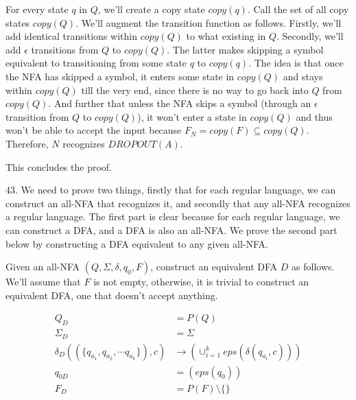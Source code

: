 \documentclass{article}
\begin{document}
For every state $q$ in $Q$, we'll create a copy state $copy(q)$. Call the set of all copy states $copy(Q)$. We'll augment the transition function as follows. Firstly, we'll add identical transitions within $copy(Q)$ to what existing in $Q$. Secondly, we'll add $\epsilon$ transitions from $Q$ to $copy(Q)$. The latter makes skipping a symbol equivalent to transitioning from some state $q$ to $copy(q)$. The idea is that once the NFA has skipped a symbol, it enters some state in $copy(Q)$ and stays within $copy(Q)$ till the very end, since there is no way to go back into $Q$ from $copy(Q)$. And further that unless the NFA skips a symbol (through an $\epsilon$ transition from $Q$ to $copy(Q)$), it won't enter a state in $copy(Q)$ and thus won't be able to accept the input because $F_N = copy(F) \subseteq copy(Q)$. Therefore, $N$ recognizes $DROPOUT(A)$.

This concludes the proof.

43. We need to prove two things, firstly that for each regular language, we can construct an all-NFA that recognizes it, and secondly that any all-NFA recognizes a regular language. The first part is clear because for each regular language, we can construct a DFA, and a DFA is also an all-NFA. We prove the second part below by constructing a DFA equivalent to any given all-NFA.

Given an all-NFA $(Q, \Sigma, \delta, q_0, F)$, construct an equivalent DFA $D$ as follows. We'll assume that $F$ is not empty, otherwise, it is trivial to construct an equivalent DFA, one that doesn't accept anything.

\begin{align*}
    Q_D                                                  &= P(Q) \\
    \Sigma_D                                             &= \Sigma \\
    \delta_D((\{q_{a_1}, q_{a_2}, \cdots q_{a_k}\}), c)  &\rightarrow (\cup_{i=1}^k eps(\delta(q_{a_i}, c))) \\
    q_{0D}                                               &= (eps(q_0)) \\
    F_D                                                  &= P(F) \setminus \{\}
\end{align*}
\end{document}
